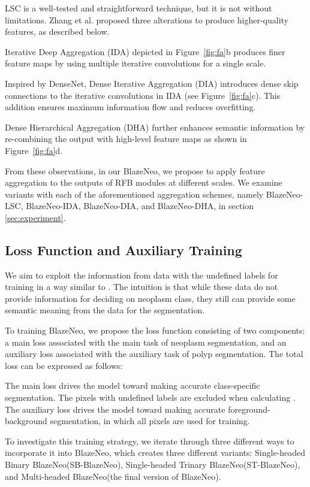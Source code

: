 \documentclass{ieeeaccess}
\newcommand{\ModelName}{BlazeNeo\xspace}
\newcommand{\DHA}{BlazeNeo-DHA\xspace}
\newcommand{\DIA}{BlazeNeo-DIA\xspace}
\newcommand{\IDA}{BlazeNeo-IDA\xspace}
\newcommand{\LSC}{BlazeNeo-LSC\xspace}
\begin{document}
LSC is a well-tested and straightforward technique, but it is not without limitations. Zhang et al. \cite{zhang2020multi} proposed three alterations to produce higher-quality features, as described below.

Iterative Deep Aggregation (IDA) depicted in Figure~\ref{fig:fa}b produces finer feature maps by using multiple iterative convolutions for a single scale.

Inspired by DenseNet, Dense Iterative Aggregation (DIA) introduces dense skip connections to the iterative convolutions in IDA (see Figure~\ref{fig:fa}c). This addition ensures maximum information flow and reduces overfitting.

Dense Hierarchical Aggregation (DHA) further enhances semantic information by re-combining the output with high-level feature maps as shown in Figure~\ref{fig:fa}d.

From these observations, in our \ModelName, we propose to apply feature aggregation to the outputs of RFB modules at different scales. We examine variants with each of the aforementioned aggregation schemes, namely \LSC, \IDA, \DIA, and \DHA, in section \ref{sec:experiment}.

\subsection{Loss Function and Auxiliary Training}
We aim to exploit the information from data with the undefined labels for training in a way similar to \cite{lan2021neounet}. The intuition is that while these data do not provide
information for deciding on neoplasm class, they still can provide some semantic meaning from the data for the segmentation.


To training \ModelName, we propose the loss function  consisting of two components: a main loss  associated with the main task of neoplasm segmentation, and an auxiliary loss  associated with the auxiliary task of polyp segmentation. The total loss can be expressed as follows:



The main loss  drives the model toward making accurate class-specific segmentation. The pixels with undefined labels are excluded when calculating . The auxiliary loss  drives the model toward making accurate foreground-background segmentation, in which all pixels are used for training.

To investigate this training strategy, we iterate through three different ways to incorporate it into \ModelName, which creates three different variants: Single-headed Binary \ModelName (SB-\ModelName), Single-headed Trinary \ModelName (ST-\ModelName), and Multi-headed \ModelName (the final version of \ModelName).
\end{document}
